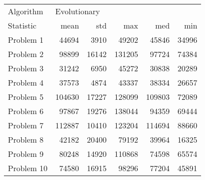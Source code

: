 \begin{tabular}{lrrrrr}
\toprule
Algorithm & \multicolumn{5}{l}{Evolutionary} \\
Statistic &         mean &    std &     max &     med &    min \\
\midrule
Problem 1  &        44694 &   3910 &   49202 &   45846 &  34996 \\
Problem 2  &        98899 &  16142 &  131205 &   97724 &  74384 \\
Problem 3  &        31242 &   6950 &   45272 &   30838 &  20289 \\
Problem 4  &        37573 &   4874 &   43337 &   38334 &  26657 \\
Problem 5  &       104630 &  17227 &  128099 &  109803 &  72089 \\
Problem 6  &        97867 &  19276 &  138044 &   94359 &  69444 \\
Problem 7  &       112887 &  10410 &  123204 &  114694 &  88660 \\
Problem 8  &        42182 &  20400 &   79192 &   39964 &  16325 \\
Problem 9  &        80248 &  14920 &  110868 &   74598 &  65574 \\
Problem 10 &        74580 &  16915 &   98296 &   77204 &  45891 \\
\bottomrule
\end{tabular}
